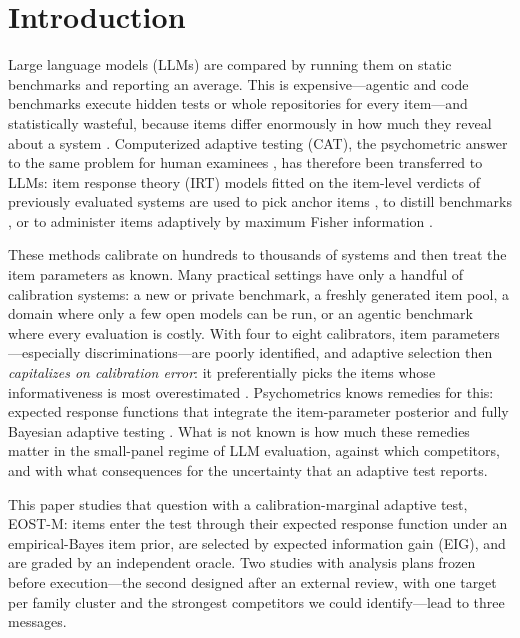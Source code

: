 \section{Introduction}
\label{sec:intro}

Large language models (LLMs) are compared by running them on static benchmarks and
reporting an average. This is expensive---agentic and code benchmarks execute hidden
tests or whole repositories for every item---and statistically wasteful, because items
differ enormously in how much they reveal about a system
\citep{lalor2016building,rodriguez2021evaluation}. Computerized adaptive testing (CAT),
the psychometric answer to the same problem for human examinees
\citep{lord1980applications,wainer2000cat}, has therefore been transferred to LLMs: item
response theory (IRT) models fitted on the item-level verdicts of previously evaluated
systems are used to pick anchor items \citep{vivek2024anchor,polo2024tinybenchmarks}, to
distill benchmarks \citep{kipnis2025metabench}, or to administer items adaptively by
maximum Fisher information \citep{hofmann2025fluid,li2026atlas,zheng2026medcat,zhou2026lost}.

These methods calibrate on hundreds to thousands of systems and then treat the item
parameters as known. Many practical settings have only a handful of calibration systems:
a new or private benchmark, a freshly generated item pool, a domain where only a few open
models can be run, or an agentic benchmark where every evaluation is costly. With four to
eight calibrators, item parameters---especially discriminations---are poorly identified,
and adaptive selection then \emph{capitalizes on calibration error}: it preferentially
picks the items whose informativeness is most overestimated
\citep{vanderlinden2000capitalization,patton2013influence}. Psychometrics knows remedies
for this: expected response functions that integrate the item-parameter posterior
\citep{mislevy1994erf} and fully Bayesian adaptive testing
\citep{vanderlinden2020fast,fink2025accounting}. What is not known is how much these
remedies matter in the small-panel regime of LLM evaluation, against which competitors,
and with what consequences for the uncertainty that an adaptive test reports.

This paper studies that question with a calibration-marginal adaptive test, EOST-M: items
enter the test through their expected response function under an empirical-Bayes item
prior, are selected by expected information gain (EIG), and are graded by an independent
oracle. Two studies with analysis plans frozen before execution---the second designed after
an external review, with one target per family cluster and the strongest competitors we
could identify---lead to three messages.

